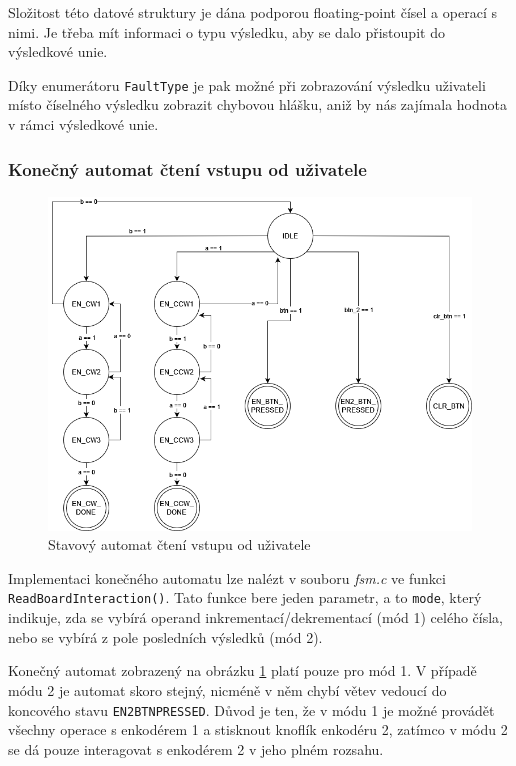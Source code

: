 \documentclass[a4paper, 11pt]{article}
\begin{document}
Složitost této datové struktury je dána podporou floating-point čísel a operací s nimi. 
Je třeba mít informaci o typu výsledku, aby se dalo přistoupit do výsledkové unie.

Díky enumerátoru \texttt{FaultType} je pak možné při zobrazování výsledku uživateli místo číselného výsledku zobrazit chybovou hlášku, aniž by nás zajímala hodnota v rámci výsledkové unie.

\subsubsection{Konečný automat čtení vstupu od uživatele}\label{2_2_4:fsm}

\begin{figure}[t]
    \centering
    \includegraphics[width=0.8\linewidth]{images/fsm.png}
    \caption{Stavový automat čtení vstupu od uživatele}
    \label{img:fsm}
\end{figure}

Implementaci konečného automatu lze nalézt v souboru \emph{fsm.c} ve funkci \texttt{ReadBoardInteraction()}.
Tato funkce bere jeden parametr, a to \texttt{mode}, který indikuje, zda se vybírá operand inkrementací/de\-kre\-men\-ta\-cí (mód 1) celého čísla, nebo se vybírá z pole posledních výsledků (mód 2).

Konečný automat zobrazený na obrázku \ref{img:fsm} platí pouze pro mód 1. 
V případě módu 2 je automat skoro stejný, nicméně v něm chybí větev vedoucí do koncového stavu \texttt{EN2\textunderscore BTN\textunderscore PRESSED}.
Důvod je ten, že v módu 1 je možné provádět všechny operace s enkodérem 1 a stisknout knoflík enkodéru 2, zatímco v módu 2 se dá pouze interagovat s enkodérem 2 v jeho plném rozsahu.
\end{document}
